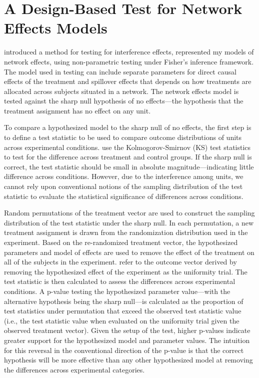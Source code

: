 \documentclass[12pt]{article}
\begin{document}
\section{A Design-Based Test for Network Effects Models}

\citet{bowers2012reasoning} introduced a method for testing for interference effects, represented my models of network effects, using non-parametric testing under Fisher's inference framework. The model used in testing can include separate parameters for direct causal effects of the treatment and spillover effects that depends on how treatments are allocated across subjects situated in a network. The network effects model is tested against the sharp null hypothesis of no effects---the hypothesis that the treatment assignment has no effect on any unit. 

To compare a hypothesized model to the sharp null of no effects, the first step is to define a test statistic to be used to compare outcome distributions of units across experimental conditions. \citet{bowers2012reasoning} use the Kolmogorov-Smirnov (KS) test statistics to test for the difference across treatment and control groups. If the sharp null is correct, the test statistic should be small in absolute magnitude---indicating little difference across conditions. However, due to the interference among units, we cannot rely upon conventional notions of the sampling distribution of the test statistic to evaluate the statistical significance of differences across conditions.  

Random permutations of the treatment vector are used to construct the sampling distribution of the test statistic under the sharp null.  In each permutation, a new treatment assignment is drawn from the randomization distribution used in the experiment. Based on the re-randomized treatment vector, the hypothesized parameters and model of effects are used to remove the effect of the treatment on all of the subjects in the experiment. \citet{bowers2012reasoning} refer to the outcome vector derived by removing the hypothesized effect of the experiment as the uniformity trial. The test statistic is then calculated to assess the differences across experimental conditions. A p-value testing the hypothesized parameter value---with the alternative hypothesis being the sharp null---is calculated as the proportion of test statistics under permutation that exceed the observed test statistic value (i.e., the test statistic value when evaluated on the uniformity trial given the observed treatment vector). Given the setup of the test, higher p-values indicate greater support for the hypothesized model and parameter values. The intuition for this reversal in the conventional direction of the p-value is that the correct hypothesis will be more effective than any other hypothesized model at removing the differences across experimental categories.
\end{document}
